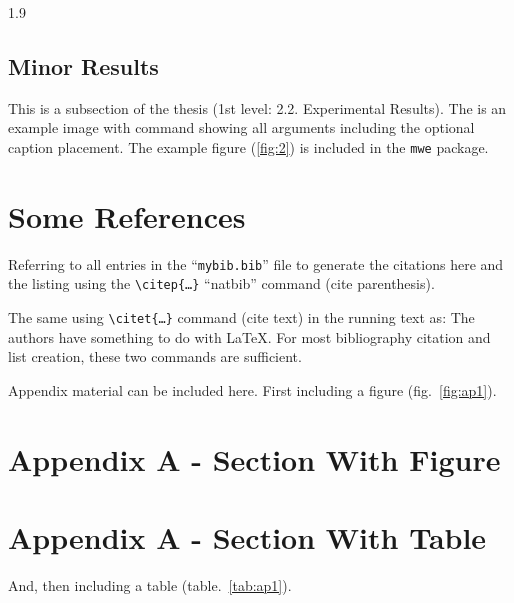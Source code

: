 \documentclass[ms-thesis,12pt,mathdesign]{ndsu-thesis-2022}
\newcommand{\makebib}{\biblio{apalike}{mybib}} %
\newcommand\myspacing{1.9} %
\begin{document}
\begin{spacing}{\myspacing}
\subsection{Minor Results}
This is a subsection of the thesis (1st level: 2.2. Experimental Results). 	\kant[8]
The  is an example image with command showing all arguments including the optional 
caption placement. The example figure (\cref{fig:2}) is included in the \texttt{mwe} package.

\kant[8]

\section{Some References}
Referring to all entries in the ``\texttt{mybib.bib}'' file to generate the citations here
and the listing using the \texttt{\textbackslash citep\{\ldots\}} ``natbib'' command
(cite parenthesis)\citep{texbook,lcompanion,latex2e,knuth1984,lesk1977,amsthm2017,
calvo2004using,cannayen2011latex,kopka2004guide,notso2021,bari2016identification}.

The same using \texttt{\textbackslash citet\{\ldots\}} command (cite text) in the running
text as: The authors \citet{texbook,lcompanion,latex2e,knuth1984,lesk1977,amsthm2017,
calvo2004using,cannayen2011latex,kopka2004guide,notso2021,bari2016identification} have something to do with \LaTeX. For most bibliography citation and 
list creation, these two commands are sufficient.

\makebib  %

Appendix material can be included here. First including a figure (fig.~\ref{fig:ap1}).

\section{Appendix A - Section With Figure}
	\kant[8]

\section{Appendix A - Section With Table}
And, then including a table (table.~\ref{tab:ap1}).


\end{spacing}
\end{document}
